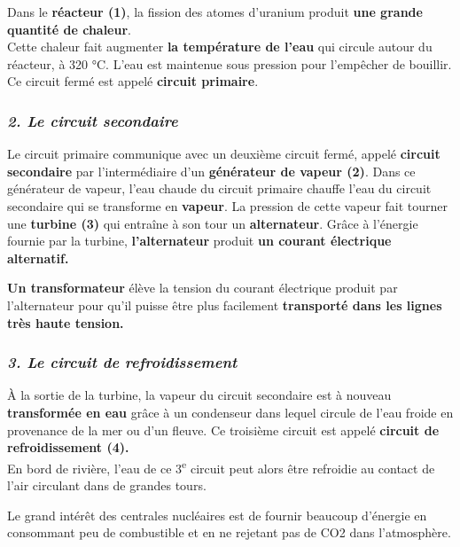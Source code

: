 Dans le \textbf{réacteur (1)}, la fission des atomes d'uranium produit
\textbf{une grande quantité de chaleur}.\\
Cette chaleur fait augmenter \textbf{la température de l'eau} qui
circule autour du réacteur, à 320 °C. L'eau est maintenue sous pression
pour l'empêcher de bouillir. Ce circuit fermé est appelé \textbf{circuit
primaire}.

\hypertarget{le-circuit-secondaire}{%
\subsubsection{\texorpdfstring{\emph{\textbf{2. Le circuit
secondaire}}}{2. Le circuit secondaire}}\label{le-circuit-secondaire}}

Le circuit primaire communique avec un deuxième circuit fermé, appelé
\textbf{circuit secondaire} par l'intermédiaire d'un \textbf{générateur
de vapeur (2)}. Dans ce générateur de vapeur, l'eau chaude du circuit
primaire chauffe l'eau du circuit secondaire qui se transforme en
\textbf{vapeur}. La pression de cette vapeur fait tourner une
\textbf{turbine (3)} qui entraîne à son tour un \textbf{alternateur}.
Grâce à l'énergie fournie par la turbine, \textbf{l'alternateur} produit
\textbf{un courant électrique alternatif.}

\textbf{Un transformateur} élève la tension du courant électrique
produit par l'alternateur pour qu'il puisse être plus facilement
\textbf{transporté dans les lignes très haute tension.}

\hypertarget{le-circuit-de-refroidissement}{%
\subsubsection{\texorpdfstring{\emph{\textbf{3. Le circuit de
refroidissement}}}{3. Le circuit de refroidissement}}\label{le-circuit-de-refroidissement}}

À la sortie de la turbine, la vapeur du circuit secondaire est à nouveau
\textbf{transformée en eau} grâce à un condenseur dans lequel circule de
l'eau froide en provenance de la mer ou d'un fleuve. Ce troisième
circuit est appelé \textbf{circuit de refroidissement (4).}\\
En bord de rivière, l'eau de ce 3\textsuperscript{e} circuit peut alors
être refroidie au contact de l'air circulant dans de grandes tours.

Le grand intérêt des centrales nucléaires est de fournir beaucoup
d'énergie en consommant peu de combustible et en ne rejetant pas de CO2
dans l'atmosphère.

